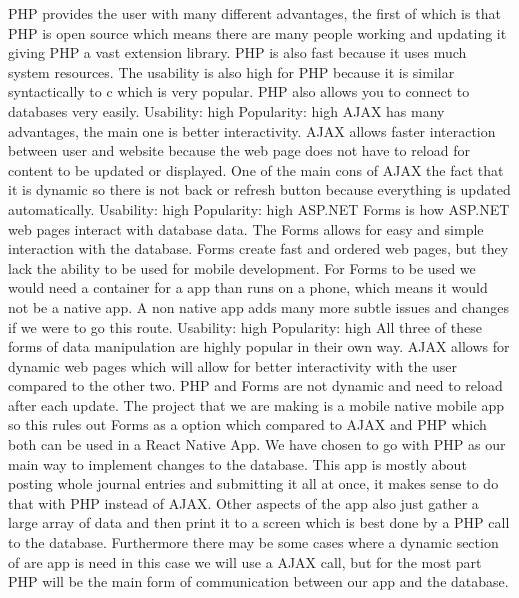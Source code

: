 \documentclass[letterpaper, 10, draftclsnofoot, onecolumn]{IEEEtran}
\begin{document}
\indent PHP provides the user with many different advantages, the first of which is that PHP is open source which means there are many people working and updating it giving PHP a vast extension library. PHP is also fast because it uses much system resources. The usability is also high for PHP because it is similar syntactically to c which is very popular. PHP also allows you to connect to databases very easily.
\newline
\newline
Usability: high
\newline
Popularity: high
\newline
\newline
\indent AJAX has many advantages, the main one is better interactivity. AJAX allows faster interaction between user and website because the web page does not have to reload for content to be updated or displayed. One of the main cons of AJAX the fact that it is dynamic so there is not back or refresh button because everything is updated automatically.
\newline
\newline
Usability: high
\newline
Popularity: high
\newline
\newline
\indent ASP.NET Forms is how ASP.NET web pages interact with database data. The Forms allows for easy and simple interaction with the database. Forms create fast and ordered web pages, but they lack the ability to be used for mobile development. For Forms to be used we would need a container for a app than runs on a phone, which means it would not be a native app. A non native app adds many more subtle issues and changes if we were to go this route.   
\newline
\newline
Usability: high
\newline
Popularity: high
\newline
\newline
\indent All three of these forms of data manipulation are highly popular in their own way. AJAX allows for dynamic web pages which will allow for better interactivity with the user compared to the other two. PHP and Forms are not dynamic and need to reload after each update. The project that we are making is a mobile native mobile app so this rules out Forms as a option which compared to AJAX and PHP which both can be used in a React Native App.  
\newline
\indent We have chosen to go with PHP as our main way to implement changes to the database. This app is mostly about posting whole journal entries and submitting it all at once, it makes sense to do that with PHP instead of AJAX. Other aspects of the app also just gather a large array of data and then print it to a screen which is best done by a PHP call to the database. Furthermore there may be some cases where a dynamic section of are app is need in this case we will use a AJAX call, but for the most part PHP will be the main form of communication between our app and the database. 
\clearpage


\end{document}
